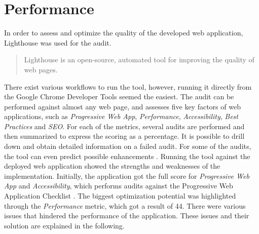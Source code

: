\section{Performance}\label{testing}
In order to assess and optimize the quality of the developed web application, Lighthouse was used for the audit. \begin{quote}
Lighthouse is an open-source, automated tool for improving the quality of web pages.
\end{quote}
There exist various workflows to run the tool, however, running it directly from the Google Chrome Developer Tools seemed the easiest. The audit can be performed against almost any web page, and assesses five key factors of web applications, such as \textit{Progressive Web App}, \textit{Performance}, \textit{Accessibility}, \textit{Best Practices} and \textit{SEO}. For each of the metrics, several audits are performed and then summarized to express the scoring as a percentage. It is possible to drill down and obtain detailed information on a failed audit. For some of the audits, the tool can even predict possible enhancements \cite{lighthouse}.
Running the tool against the deployed web application showed the strengths and weaknesses of the implementation. Initially, the application got the full score for \textit{Progressive Web App} and \textit{Accessibility}, which performs audits against the Progressive Web Application Checklist \cite{pwachecklist}. The biggest optimization potential was highlighted through the \textit{Performance} metric, which got a result of 44. There were various issues that hindered the performance of the application. These issues and their solution are explained in the following.

